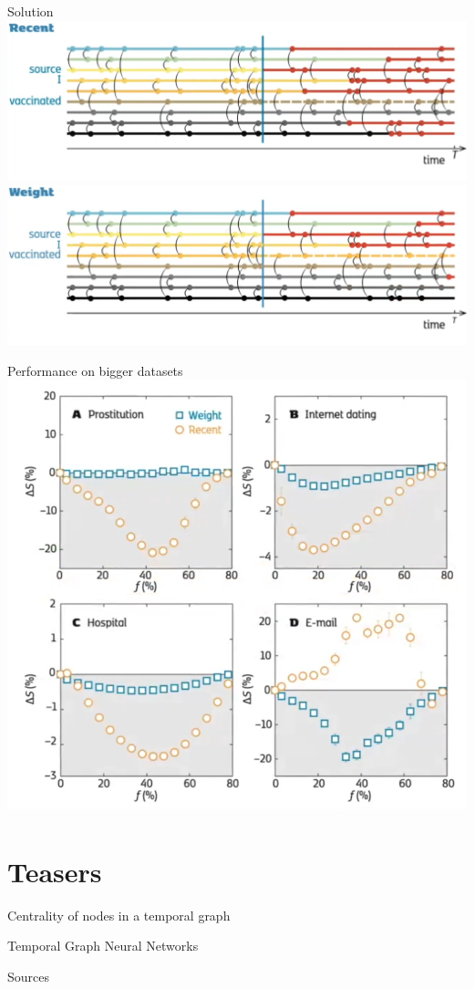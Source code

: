 \documentclass{beamer}
\begin{document}
\begin{frame}{Solution}
  \includegraphics[width=\linewidth]{media/solution_recent.png}
  \includegraphics[width=\linewidth]{media/solution_weight.png} 
\end{frame}

\begin{frame}{Performance on bigger datasets}
  \centering
  \includegraphics[width=0.6\linewidth]{media/performance_protocols.png}
  \cite{Lee_2012}
\end{frame}



\section{Teasers}
\begin{frame}{Centrality of nodes in a temporal graph}

\end{frame}

\begin{frame}{Temporal Graph Neural Networks}
\end{frame}

\begin{frame}[allowframebreaks]{Sources}
\end{frame}
\end{document}
